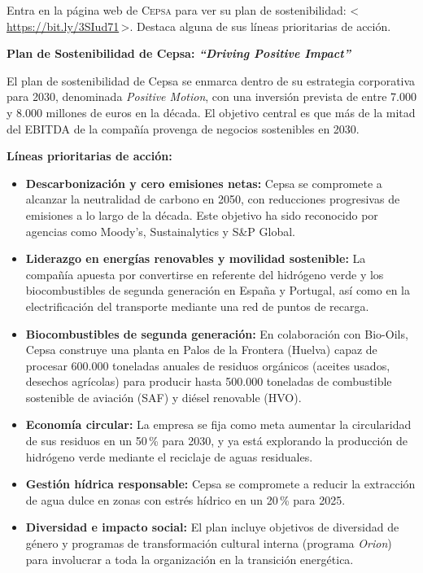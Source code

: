 {
	Entra en la página web de \textsc{Cepsa} para ver su plan de sostenibilidad:
	\textless\,\url{https://bit.ly/3SIud71}\,\textgreater.
	Destaca alguna de sus líneas prioritarias de acción.
}

\begin{solution}

	\textbf{Plan de Sostenibilidad de Cepsa: \textit{``Driving Positive Impact''}}

	El plan de sostenibilidad de Cepsa se enmarca dentro de su estrategia corporativa para 2030,
	denominada \textit{Positive Motion}, con una inversión prevista de entre 7.000 y 8.000 millones
	de euros en la década. El objetivo central es que más de la mitad del EBITDA de la compañía
	provenga de negocios sostenibles en 2030.

	\medskip

	\textbf{Líneas prioritarias de acción:}

	\begin{itemize}
		\item \textbf{Descarbonización y cero emisiones netas:} Cepsa se compromete a alcanzar
		      la neutralidad de carbono en 2050, con reducciones progresivas de emisiones a lo largo
		      de la década. Este objetivo ha sido reconocido por agencias como Moody's, Sustainalytics
		      y S\&P Global.

		\item \textbf{Liderazgo en energías renovables y movilidad sostenible:} La compañía
		      apuesta por convertirse en referente del hidrógeno verde y los biocombustibles de segunda
		      generación en España y Portugal, así como en la electrificación del transporte mediante
		      una red de puntos de recarga.

		\item \textbf{Biocombustibles de segunda generación:} En colaboración con Bio-Oils, Cepsa
		      construye una planta en Palos de la Frontera (Huelva) capaz de procesar 600.000 toneladas
		      anuales de residuos orgánicos (aceites usados, desechos agrícolas) para producir hasta
		      500.000 toneladas de combustible sostenible de aviación (SAF) y diésel renovable (HVO).

		\item \textbf{Economía circular:} La empresa se fija como meta aumentar la circularidad
		      de sus residuos en un 50\,\% para 2030, y ya está explorando la producción de hidrógeno
		      verde mediante el reciclaje de aguas residuales.

		\item \textbf{Gestión hídrica responsable:} Cepsa se compromete a reducir la extracción
		      de agua dulce en zonas con estrés hídrico en un 20\,\% para 2025.

		\item \textbf{Diversidad e impacto social:} El plan incluye objetivos de diversidad de
		      género y programas de transformación cultural interna (programa \textit{Orion}) para
		      involucrar a toda la organización en la transición energética.
	\end{itemize}
	\medskip
\end{solution}
